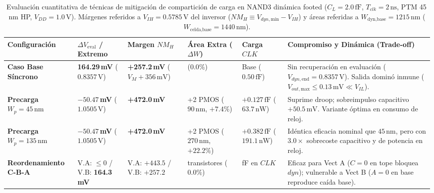 \begin{table}[htbp]
\centering
\fontsize{7pt}{8.3pt}\selectfont
\caption[Evaluación cuantitativa y trade-offs de técnicas de mitigación]{Evaluación cuantitativa de técnicas de mitigación de compartición de carga en NAND3 dinámica footed ($C_L=2.0\,\text{fF}$, $T_{clk}=2\,\text{ns}$, PTM 45\,nm HP, $V_{DD}=1.0\,\text{V}$). Márgenes referidos a $V_{IH}=0.5785\,\text{V}$ del inversor ($NM_H \equiv V_{dyn,\text{min}} - V_{IH}$) y áreas referidas a $W_{\text{dyn,base}} = 1215\,\text{nm}$ ($W_{\text{celda,base}} = 1440\,\text{nm}$).}
\label{tab:mitigaciones_act2}
\begin{tabularx}{\linewidth}{@{}>{\RaggedRight\arraybackslash}p{2.3cm} >{\centering\arraybackslash}p{1.6cm} >{\centering\arraybackslash}p{1.7cm} >{\centering\arraybackslash}p{1.7cm} >{\centering\arraybackslash}p{1.3cm} >{\RaggedRight\arraybackslash}X@{}}
\toprule
\textbf{Configuración} & \textbf{$\Delta V_{\text{eval}}$ / Extremo} & \textbf{Margen $NM_H$} & \textbf{Área Extra ($\Delta W$)} & \textbf{Carga $CLK$} & \textbf{Compromiso y Dinámica (Trade-off)} \\
\midrule
\textbf{Caso Base Síncrono} & \textbf{164.29\,mV} ($0.8357\,\text{V}$) & \textbf{+257.2\,mV} ($V_M+356\,\text{mV}$) & 0 ($0.0\%$) & Base ($0.50\,\text{fF}$) & Sin recuperación en evaluación ($V_{dyn,\text{end}} = 0.8357\,\text{V}$). Salida dominó inmune ($V_{out,\text{max}} \le 0.13\,\text{mV} \ll V_{IL}$). \\
\textbf{Precarga $W_p=45\,\text{nm}$} & \textbf{$-50.47$\,mV} ($1.0505\,\text{V}$) & \textbf{+472.0\,mV} & +2 PMOS ($90\,\text{nm}$, $+7.4\%$) & $+0.127\,\text{fF}$ ($63.7\,\text{nW}$) & Suprime droop; sobreimpulso capacitivo $+50.5\,\text{mV}$. Variante óptima en consumo de reloj. \\
\textbf{Precarga $W_p=135\,\text{nm}$} & \textbf{$-50.47$\,mV} ($1.0505\,\text{V}$) & \textbf{+472.0\,mV} & +2 PMOS ($270\,\text{nm}$, $+22.2\%$) & $+0.382\,\text{fF}$ ($191.1\,\text{nW}$) & Idéntica eficacia nominal que $45\,\text{nm}$, pero con $3.0\times$ sobrecoste capacitivo y de potencia en reloj. \\
\textbf{Reordenamiento C-B-A} & V.A: $\le 0$ / V.B: \textbf{164.3\,mV} & V.A: $+443.5$ / V.B: $+257.2$ & 0 transistores ($0.0\%$) & 0 fF en $CLK$ & Eficaz para Vect A ($C=0$ en tope bloquea $dyn$); vulnerable a Vect B ($A=0$ en base reproduce caída base). \\

\end{tabularx}
\end{table}
